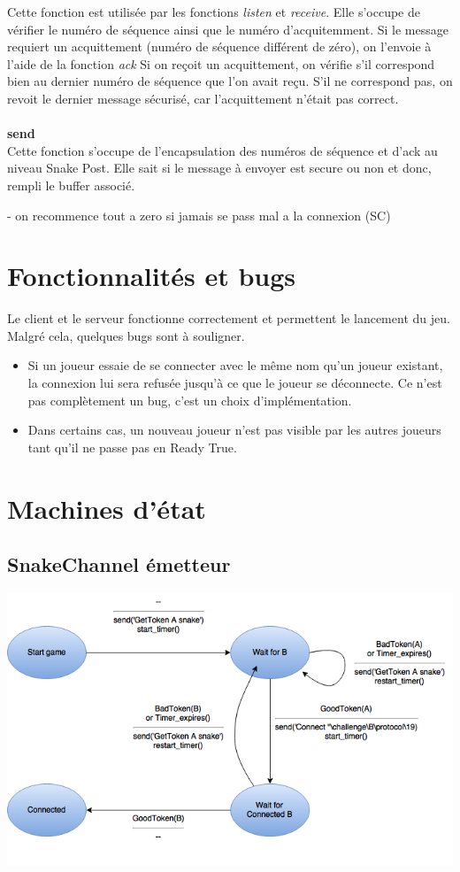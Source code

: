 \documentclass[a4paper]{article}
\begin{document}
Cette fonction est utilisée par les fonctions \textit{listen} et \textit{receive}. Elle s'occupe de vérifier le numéro de séquence ainsi que le numéro d'acquitemment.
Si le message requiert un acquittement (numéro de séquence différent de zéro), on l'envoie à l'aide de la fonction \textit{ack}
Si on reçoit un acquittement, on vérifie s'il correspond bien au dernier numéro de séquence que l'on avait reçu.
S'il ne correspond pas, on revoit le dernier message sécurisé, car l'acquittement n'était pas correct.\\\\
\textbf{send}\\
Cette fonction s'occupe de l'encapsulation des numéros de séquence et d'ack au niveau Snake Post. Elle sait si le message à envoyer est secure ou non et donc, rempli le buffer associé.

- on recommence tout a zero si jamais se pass mal a la connexion (SC)

\section{Fonctionnalités et bugs}
Le client et le serveur fonctionne correctement et permettent le lancement du jeu. Malgré cela, quelques bugs sont à souligner.
\begin{itemize}
\item Si un joueur essaie de se connecter avec le même nom qu'un joueur existant, la connexion lui sera refusée jusqu'à ce que le joueur se déconnecte.
Ce n'est pas complètement un bug, c'est un choix d'implémentation.
\item Dans certains cas, un nouveau joueur n'est pas visible par les autres joueurs tant qu'il ne passe pas en Ready True.
\end{itemize}

\section{Machines d'état}
\subsection{SnakeChannel émetteur}
\begin{center}
\includegraphics[scale=0.7]{sc_emetteur.png}
\end{center}
\end{document}
